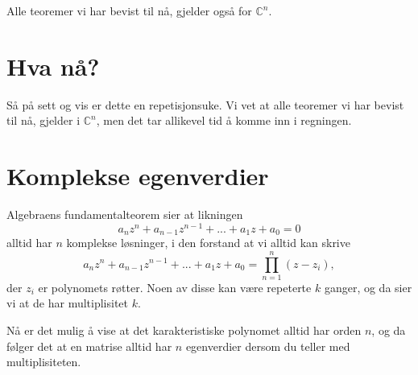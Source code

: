 \begin{thm}
Alle teoremer vi har bevist til nå, gjelder også for $\mathbb C^n$. 
\end{thm}




\section*{Hva nå?}
Så på sett og vis er dette en repetisjonsuke. 
Vi vet at alle teoremer vi har bevist til nå, gjelder i $\mathbb C^n$, 
men det tar allikevel tid å komme inn i regningen. 



\section*{Komplekse egenverdier}
Algebraens fundamentalteorem sier at likningen
\[
a_nz^n+a_{n-1}z^{n-1}+...+a_1z+a_0=0
\]
alltid har $n$ komplekse løsninger, i den forstand at vi alltid kan skrive
\[
a_nz^n+a_{n-1}z^{n-1}+...+a_1z+a_0=\prod_{n=1}^n (z-z_i),
\]
der $z_i$ er polynomets røtter. Noen av disse kan være repeterte $k$ ganger, og da sier vi at de har multiplisitet $k$. 

Nå er det mulig å vise at det karakteristiske polynomet alltid har orden $n$, 
og da følger det at en matrise alltid har $n$ egenverdier dersom du 
teller med multiplisiteten. 


\kapittelslutt
